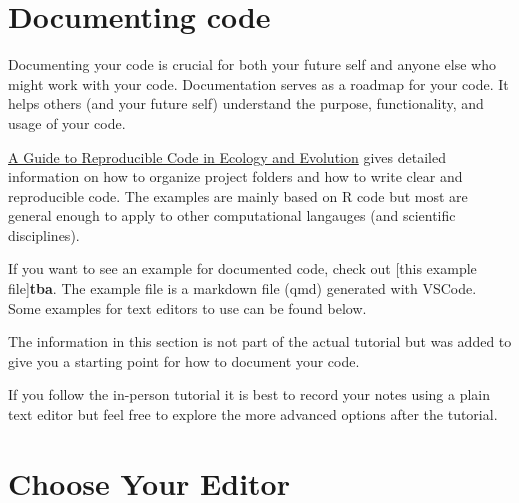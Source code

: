 \documentclass[
  letterpaper,
  DIV=11,
  numbers=noendperiod]{scrreprt}
\author{}
\date{}
\renewcommand*\contentsname{Table of contents}
\newcommand\contentsname{Table of contents}
\begin{document}

\renewcommand*\contentsname{Table of contents}
{
\hypersetup{linkcolor=}
\setcounter{tocdepth}{1}
\tableofcontents
}
\section{Documenting code}\label{documenting-code}

Documenting your code is crucial for both your future self and anyone
else who might work with your code. Documentation serves as a roadmap
for your code. It helps others (and your future self) understand the
purpose, functionality, and usage of your code.

\href{https://www.britishecologicalsociety.org/wp-content/uploads/2017/12/guide-to-reproducible-code.pdf}{A
Guide to Reproducible Code in Ecology and Evolution} gives detailed
information on how to organize project folders and how to write clear
and reproducible code. The examples are mainly based on R code but most
are general enough to apply to other computational langauges (and
scientific disciplines).

If you want to see an example for documented code, check out {[}this
example file{]}\textbf{tba}. The example file is a markdown file (qmd)
generated with VSCode. Some examples for text editors to use can be
found below.

\begin{tcolorbox}[enhanced jigsaw, colback=white, coltitle=black, colframe=quarto-callout-note-color-frame, leftrule=.75mm, bottomtitle=1mm, colbacktitle=quarto-callout-note-color!10!white, breakable, opacityback=0, toprule=.15mm, rightrule=.15mm, toptitle=1mm, title=\textcolor{quarto-callout-note-color}{\faInfo}\hspace{0.5em}{Note}, opacitybacktitle=0.6, bottomrule=.15mm, titlerule=0mm, arc=.35mm, left=2mm]

The information in this section is not part of the actual tutorial but
was added to give you a starting point for how to document your code.

If you follow the in-person tutorial it is best to record your notes
using a plain text editor but feel free to explore the more advanced
options after the tutorial.

\end{tcolorbox}

\section{Choose Your Editor}\label{choose-your-editor}
\end{document}

